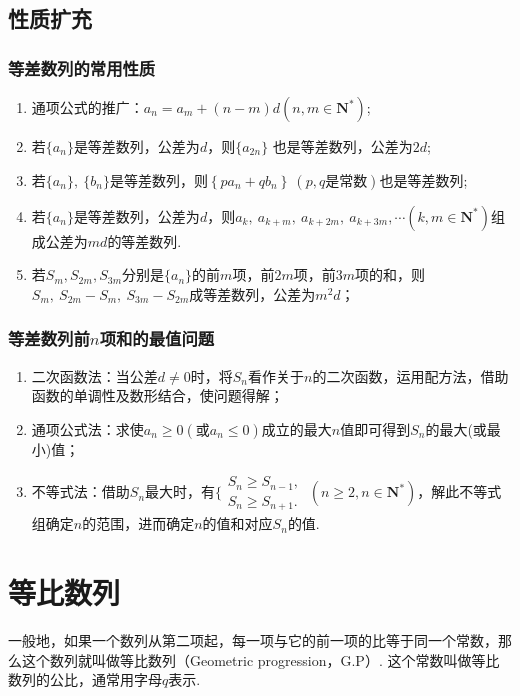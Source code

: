   \subsection{性质扩充}
    \subsubsection{等差数列的常用性质}
      \begin{enumerate}[(1)]
        \item 通项公式的推广：$ a_n=a_m+\left(n-m\right)d \left(n,m\in\mathbf{N^*}\right)$;
        \item 若$\{a_n\}$是等差数列，公差为$ d $，则$\{a_{2n}\}$ 也是等差数列，公差为$ 2d $;
        \item 若$\{a_n\},~\{b_n\}$是等差数列，则$ \left\{pa_n+qb_n\right\}~(p,q\text{是常数}) $也是等差数列;
        \item 若$\{a_n\}$是等差数列，公差为$ d $，则$ a_k,~a_{k+m},~ a_{k+2m},~a_{k+3m},\cdots\left(k,m\in\mathbf{N^*}\right)$组成公差为$ md $的等差数列.
        \item 若$ S_m,S_{2m},S_{3m} $分别是$\{a_n\}$的前$ m $项，前$ 2m $项，前$ 3m $项的和，则$ S_m,~S_{2m}-S_m,~S_{3m}-S_{2m} $成等差数列，公差为$m^2d$；
      \end{enumerate}
    \subsubsection{等差数列前$ n $项和的最值问题}
      \begin{enumerate}[1)]
        \item 二次函数法：当公差$d\ne0$时，将$ S_n $看作关于$ n $的二次函数，运用配方法，借助函数的单调性及数形结合，使问题得解；
        \item 通项公式法：求使$ a_n\ge0 \left(\text{或}a_n\le0\right)$成立的最大$ n $值即可得到$ S_n $的最大(或最小)值；
        \item 不等式法：借助$ S_n $最大时，有$\Bigg\{\begin{aligned}
      S_n\ge S_{n-1},\\
      S_n\ge S_{n+1}.
      \end{aligned}~(n\ge2,n\in\mathbf{N^*})$，解此不等式组确定$ n $的范围，进而确定$ n $的值和对应$ S_n $的值.
      \end{enumerate}
\section{等比数列}
  一般地，如果一个数列从第二项起，每一项与它的前一项的比等于同一个常数，那么这个数列就叫做等比数列（Geometric progression，G.P）.
  这个常数叫做等比数列的公比，通常用字母$ q $表示.
